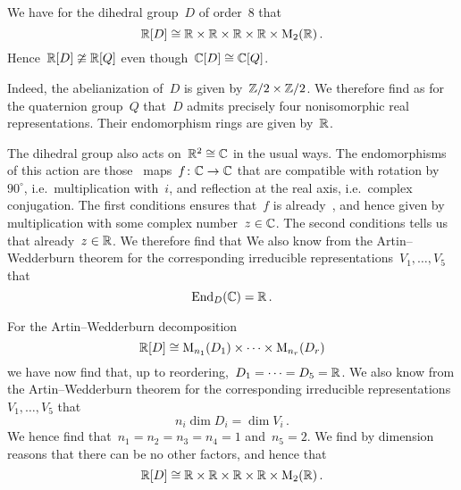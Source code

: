 \begin{remark}
  We have for the dihedral group~$D$ of order~$8$ that
  \[
    \mathbb{R}[D]
    \cong
    \mathbb{R} \times \mathbb{R} \times \mathbb{R} \times \mathbb{R} \times \operatorname{M}_{2}(\mathbb{R})  \,.
  \]
  Hence~$\mathbb{R}[D] \ncong \mathbb{R}[Q]$ even though~$\mathbb{C}[D] \cong \mathbb{C}[Q]$.
  
  Indeed, the abelianization of~$D$ is given by~$\mathbb{Z}/2 \times \mathbb{Z}/2$.
  We therefore find as for the quaternion group~$Q$ that~$D$ admits precisely four nonisomorphic real  representations.
  Their endomorphism rings are given by~$\mathbb{R}$.
  
  The dihedral group also acts on~$\mathbb{R}^2 \cong \mathbb{C}$ in the usual ways.
  The endomorphisms of this action are those~ maps~$f \colon \mathbb{C} \to \mathbb{C}$ that are compatible with rotation by~$90^\circ$, i.e.\ multiplication with~$i$, and reflection at the real axis, i.e.\ complex conjugation.
  The first conditions ensures that~$f$ is already~, and hence given by multiplication with some complex number~$z \in \mathbb{C}$.
  The second conditions tells us that already~$z \in \mathbb{R}$.
  We therefore find that
  We also know from the Artin--Wedderburn theorem for the corresponding irreducible representations~$V_1, \dotsc, V_5$ that
  \[
    \operatorname{End}_{D}(\mathbb{C})
    =
    \mathbb{R} \,.
  \]
  
  For the Artin--Wedderburn decomposition
  \[
    \mathbb{R}[D]
    \cong
    \operatorname{M}_{n_1}(D_1) \times \dotsb \times \operatorname{M}_{n_r}(D_r)
  \]
  we have now find that, up to reordering,~$D_1 = \dotsb = D_5 = \mathbb{R}$.
  We also know from the Artin--Wedderburn theorem for the corresponding irreducible representations~$V_1, \dotsc, V_5$ that
  \[
    n_i \dim D_i
    =
    \dim V_i  \,.
  \]
  We hence find that~$n_1 = n_2 = n_3 = n_4 = 1$ and~$n_5 = 2$.
  We find by dimension reasons that there can be no other factors, and hence that
  \[
    \mathbb{R}[D]
    \cong
    \mathbb{R} \times \mathbb{R} \times \mathbb{R} \times \mathbb{R} \times \operatorname{M}_{2}(\mathbb{R})  \,.
  \]
\end{remark}






















